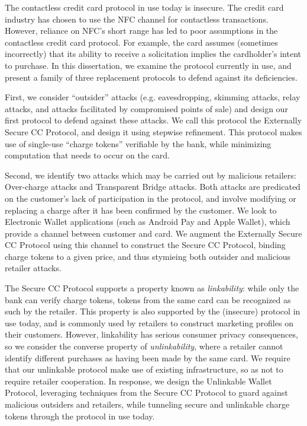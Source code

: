 The contactless credit card protocol in use today is insecure.
The credit card industry has chosen to use the NFC channel for contactless transactions.
However, reliance on NFC's short range has led to poor assumptions in the contactless credit card protocol.
For example, the card assumes (sometimes incorrectly) that its ability to receive a solicitation implies the cardholder's intent to purchase.
In this dissertation, we examine the protocol currently in use,
    and present a family of three replacement protocols to defend against its deficiencies.

First, we consider ``outsider'' attacks (e.g. eavesdropping, skimming attacks, relay attacks, and attacks facilitated by compromised points of sale)
    and design our first protocol to defend against these attacks.
We call this protocol the Externally Secure CC Protocol, and design it using stepwise refinement.
This protocol makes use of single-use ``charge tokens'' verifiable by the bank, while minimizing computation that needs to occur on the card.

Second, we identify two attacks which may be carried out by malicious retailers:
    Over-charge attacks and Transparent Bridge attacks.
Both attacks are predicated on the customer's lack of participation in the protocol,
    and involve modifying or replacing a charge after it has been confirmed by the customer.
We look to Electronic Wallet applications (such as Android Pay and Apple Wallet), which provide a channel between customer and card.
We augment the Externally Secure CC Protocol using this channel to construct the Secure CC Protocol,
    binding charge tokens to a given price, and thus stymieing both outsider and malicious retailer attacks.

The Secure CC Protocol supports a property known as \emph{linkability}:
    while only the bank can verify charge tokens, tokens from the same card can be recognized as such by the retailer.
This property is also supported by the (insecure) protocol in use today,
    and is commonly used by retailers to construct marketing profiles on their customers.
However, linkability has serious consumer privacy consequences, so we consider the converse property of
    \emph{unlinkability}, where a retailer cannot identify different purchases as having been made by the same card.
We require that our unlinkable protocol make use of existing infrastructure, so as not to require retailer cooperation.
In response, we design the Unlinkable Wallet Protocol,
    leveraging techniques from the Secure CC Protocol to guard against malicious outsiders and retailers,
    while tunneling secure and unlinkable charge tokens through the protocol in use today.
